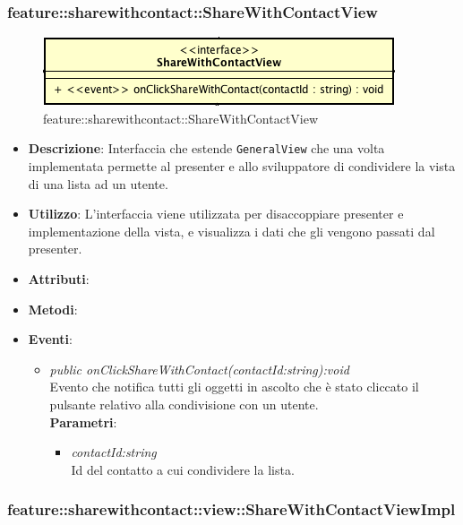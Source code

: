 \subsubsection{feature::sharewithcontact::ShareWithContactView}

\label{feature::sharewithcontact::ShareWithContactView}
\begin{figure}[ht]
	\centering
	\includegraphics[scale=0.5]{Sezioni/SottosezioniST/img/app/ShareWithContactView.png}
	\caption{feature::sharewithcontact::ShareWithContactView}
\end{figure}

\begin{itemize}
\item \textbf{Descrizione}: Interfaccia che estende \texttt{GeneralView} che una volta implementata permette al presenter e allo sviluppatore di condividere la vista di una lista ad un utente.
\item \textbf{Utilizzo}: L'interfaccia viene utilizzata per disaccoppiare presenter e implementazione della vista, e visualizza i dati che gli vengono passati dal presenter.
\item \textbf{Attributi}: 
\item \textbf{Metodi}:
\item \textbf{Eventi}:
\begin{itemize}
\item \textit{public onClickShareWithContact(contactId:string):void}\\
	Evento che notifica tutti gli oggetti in ascolto che è stato cliccato il pulsante relativo alla condivisione con un utente.
	\\ \textbf{Parametri}: \begin{itemize}
	\item \textit{contactId:string}\\
	Id del contatto a cui condividere la lista.
	\end{itemize} 
\end{itemize}
\end{itemize}

\subsubsection{feature::sharewithcontact::view::ShareWithContactViewImpl}

